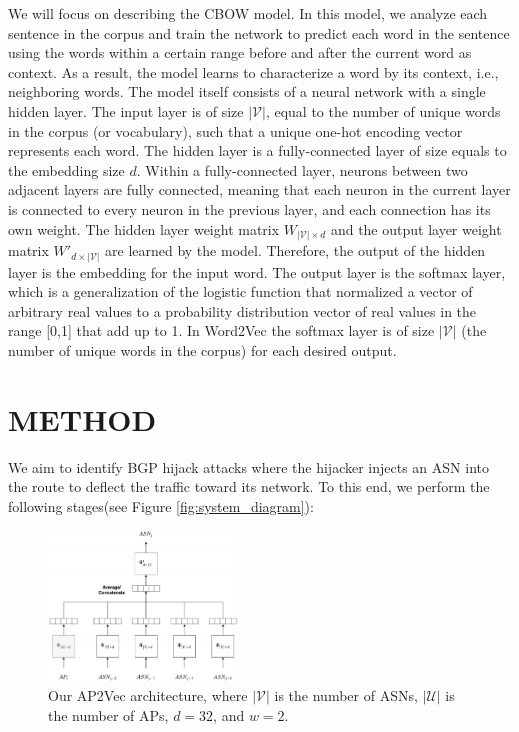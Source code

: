 \documentclass[10pt,journal]{IEEEtran}
\begin{document}
We will focus on describing the CBOW model. In this model, we analyze each sentence in the corpus and train the network to predict each word in the sentence using the words within a certain range before and after the current word as context. As a result, the model learns to characterize a word by its context, i.e., neighboring words. The model itself consists of a neural network with a single hidden layer. The input layer is of size $|\mathcal{V}|$, equal to the number of unique words in the corpus (or vocabulary), such that a unique one-hot encoding vector represents each word. The hidden layer is a fully-connected layer of size equals to the embedding size $d$. Within a fully-connected layer, neurons between two adjacent layers are fully connected, meaning that each neuron in the current layer is connected to every neuron in the previous layer, and each connection has its own weight. The hidden layer weight matrix $W_{|\mathcal{V}|\times d}$ and the output layer weight matrix $W'_{d\times|\mathcal{V}|}$ are learned by the model. Therefore, the output of the hidden layer is the embedding for the input word. The output layer is the softmax layer, which is a generalization of the logistic function that normalized a vector of arbitrary real values to a probability distribution vector of real values in the range [0,1] that add up to 1. In Word2Vec the softmax layer is of size $|\mathcal{V}|$ (the number of unique words in the corpus) for each desired output.

\section{METHOD}
We aim to identify BGP hijack attacks where the hijacker injects an ASN into the route to deflect the traffic toward its network. To this end, we perform the following stages(see Figure \ref{fig:system_diagram}):

\begin{figure}[htbp]
\centering
\includegraphics[width=0.45\textwidth]{figures/fig2.png}
\caption{Our AP2Vec architecture, where $|\mathcal{V}|$ is the number of ASNs, $|\mathcal{U}|$ is the number of APs, $d=32$, and $w=2$.}
\label{fig:ap2vec_architecture}
\end{figure}
\end{document}
